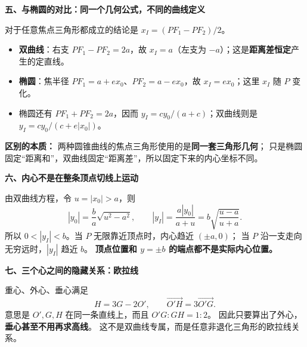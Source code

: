 \begin{explanationbox}
\textbf{五、与椭圆的对比：同一个几何公式，不同的曲线定义}

对于任意焦点三角形都成立的结论是
$\displaystyle x_I=(PF_1-PF_2)/2$。
\begin{itemize}
  \item \textbf{双曲线}：右支 $PF_1-PF_2=2a$，故 $x_I=a$（左支为 $-a$）；这是\textbf{距离差恒定}产生的定直线。
  \item \textbf{椭圆}：焦半径 $PF_1=a+ex_0$、$PF_2=a-ex_0$，故 $x_I=ex_0$；这里 $x_I$ 随 $P$ 变化。
  \item 椭圆还有 $PF_1+PF_2=2a$，因而 $y_I=cy_0/(a+c)$；双曲线则是 $y_I=cy_0/(c+e|x_0|)$。
\end{itemize}
\textbf{区别的本质：} 两种圆锥曲线的焦点三角形使用的是\textbf{同一套三角形几何}；
只是椭圆固定“距离和”，双曲线固定“距离差”，所以固定下来的内心坐标不同。

\textbf{六、内心不是在整条顶点切线上运动}

由双曲线方程，令 $u=|x_0|>a$，则
\[
|y_0|=\frac ba\sqrt{u^2-a^2},\qquad
|y_I|=\frac{a|y_0|}{a+u}
=b\sqrt{\frac{u-a}{u+a}}.
\]
所以 $0<|y_I|<b$。当 $P$ 无限靠近顶点时，内心趋近 $(\pm a,0)$；
当 $P$ 沿一支走向无穷远时，$|y_I|$ 趋近 $b$。
\textbf{顶点位置和 $y=\pm b$ 的端点都不是实际内心位置。}

\textbf{七、三个心之间的隐藏关系：欧拉线}

重心、外心、垂心满足
\[
\boxed{H=3G-2O'},\qquad \overrightarrow{O'H}=3\overrightarrow{O'G}.
\]
意思是 $O',G,H$ 在同一条直线上，而且 $O'G:GH=1:2$。
因此只要算出了外心，\textbf{垂心甚至不用再求高线}。
这不是双曲线专属，而是任意非退化三角形的欧拉线关系。
\end{explanationbox}
